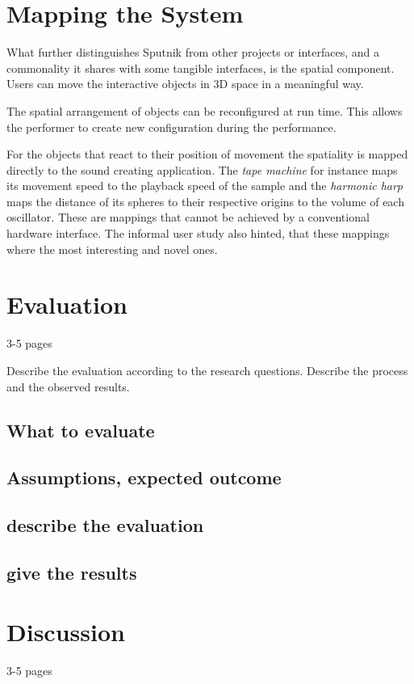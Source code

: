\documentclass[10pt,a4paper]{scrartcl}
\begin{document}
\section{Mapping the System}
What further distinguishes Sputnik from other projects or interfaces, and a commonality it shares with some tangible interfaces, is the spatial component. Users can move the interactive objects in 3D space in a meaningful way.

The spatial arrangement of objects can be reconfigured at run time. This allows the performer to create new configuration during the performance. 

For the objects that react to their position of movement the spatiality is mapped directly to the sound creating application. The \emph{tape machine} for instance maps its movement speed to the playback speed of the sample and the \emph{harmonic harp} maps the distance of its spheres to their respective origins to the volume of each oscillator. These are mappings that cannot be achieved by a conventional hardware interface. The informal user study also hinted, that these mappings where the most interesting and novel ones.



\section{Evaluation}
\label{sec:evaluation}
3-5 pages

Describe the evaluation according to the research questions. Describe the process and the observed results.

\subsection{What to evaluate}
\subsection{Assumptions, expected outcome}
\subsection{describe the evaluation}
\subsection{give the results}


\section{Discussion}
\label{sec:discussion}
3-5 pages
\end{document}
